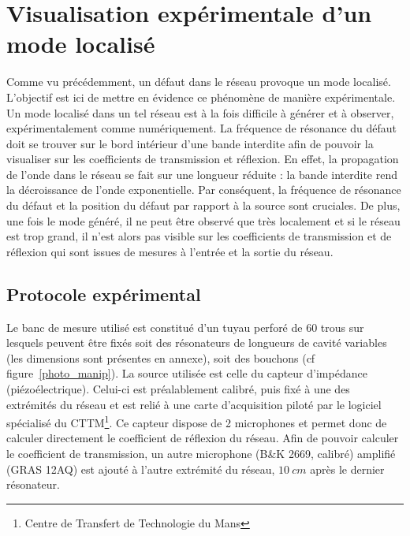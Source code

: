 \chapter{Visualisation expérimentale d'un mode localisé}
Comme vu précédemment, un défaut dans le réseau provoque un mode localisé. L'objectif est ici de mettre en évidence ce phénomène de manière expérimentale.\\


Un mode localisé dans un tel réseau est à la fois difficile à générer et à observer, expérimentalement comme numériquement. La fréquence de résonance du défaut doit se trouver sur le bord intérieur d'une bande interdite afin de pouvoir la visualiser sur les coefficients de transmission et réflexion. En effet, la propagation de l'onde dans le réseau se fait sur une longueur réduite : la bande interdite rend la décroissance de l'onde exponentielle. Par conséquent, la fréquence de résonance du défaut et la position du défaut par rapport à la source sont cruciales. De plus, une fois le mode généré, il ne peut être observé que très localement et si le réseau est trop grand, il n'est alors pas visible sur les coefficients de transmission et de réflexion qui sont issues de mesures à l'entrée et la sortie du réseau.


\section{Protocole expérimental}
Le banc de mesure utilisé est constitué d'un tuyau perforé de 60 trous sur lesquels peuvent être fixés soit des résonateurs de longueurs de cavité variables (les dimensions sont présentes en annexe), soit des bouchons (cf figure~\ref{photo_manip}). La source utilisée est celle du capteur d'impédance (piézoélectrique). Celui-ci est préalablement calibré, puis fixé à une des extrémités du réseau et est relié à une carte d'acquisition piloté par le logiciel spécialisé du CTTM\footnote{Centre de Transfert de Technologie du Mans}. Ce capteur dispose de 2 microphones et permet donc de calculer directement le coefficient de réflexion du réseau. Afin de pouvoir calculer le coefficient de transmission, un autre microphone (B\&K 2669, calibré) amplifié (GRAS 12AQ) est ajouté à l'autre extrémité du réseau, $10~cm$ après le dernier résonateur.


